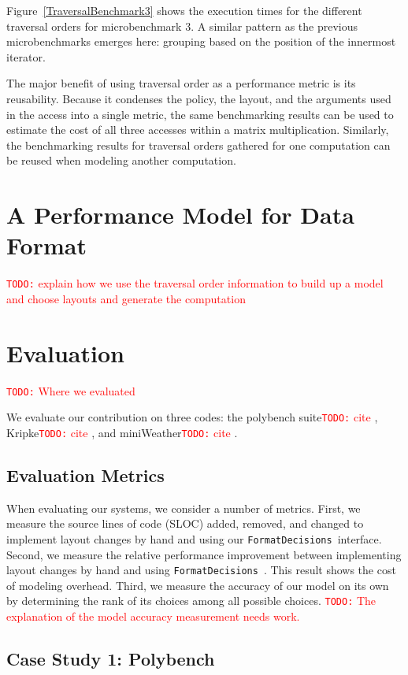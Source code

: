 \documentclass[sigconf, table]{acmart}
\newcommand{\todo}[1]{{\textcolor{red}{{\tt{TODO:}}\,\,#1 }}}
\newcommand{\nc}[0]{\todo{cite}}
\newcommand{\FormatDecisions}[0]{{\texttt{FormatDecisions}}~}
\begin{document}
Figure~\ref{TraversalBenchmark3} shows the execution times for the different traversal orders for microbenchmark 3. 
A similar pattern as the previous microbenchmarks emerges here: grouping based on the position of the innermost iterator. 

The major benefit of using traversal order as a performance metric is its reusability. 
Because it condenses the policy, the layout, and the arguments used in the access into a single metric, the same benchmarking results can be used to estimate the cost of all three accesses within a matrix multiplication. 
Similarly, the benchmarking results for traversal orders gathered for one computation can be reused when modeling another computation.

\section{A Performance Model for Data Format}

\todo{explain how we use the traversal order information to build up a model and choose layouts and generate the computation}

\section{Evaluation}

\todo{Where we evaluated}

We evaluate our contribution on three codes: the polybench suite\nc, Kripke\nc, and miniWeather\nc.


\subsection{Evaluation Metrics}
When evaluating our systems, we consider a number of metrics. 
First,  we measure the source lines of code (SLOC) added, removed, and changed to implement layout changes by hand and using our \FormatDecisions interface.
Second, we measure the relative performance improvement between implementing layout changes by hand and using \FormatDecisions. 
This result shows the cost of modeling overhead.
Third, we measure the accuracy of our model on its own by determining the rank of its choices among all possible choices.
\todo{The explanation of the model accuracy measurement needs work.} 

\subsection{Case Study 1: Polybench}
\end{document}
